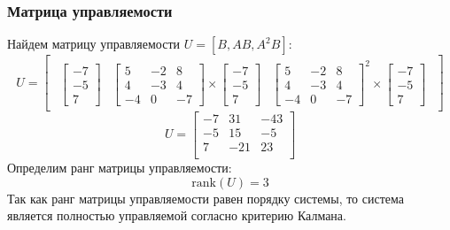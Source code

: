 \subsubsection{Матрица управляемости}
Найдем матрицу управляемости $U = [B, AB, A^2B]$: 
\begin{equation}
    U = \begin{bmatrix} 
        \begin{array}{c|c|c}
            \begin{bmatrix}
                -7 \\
                -5 \\
                7
            \end{bmatrix} & 
            \begin{bmatrix}
                5 & -2 & 8 \\
                4 & -3 & 4 \\
                -4 & 0 & -7
            \end{bmatrix} \times 
            \begin{bmatrix}
                -7 \\
                -5 \\
                7
            \end{bmatrix} &
            \begin{bmatrix}
                5 & -2 & 8 \\
                4 & -3 & 4 \\
                -4 & 0 & -7
            \end{bmatrix}^2 \times
            \begin{bmatrix}
                -7 \\
                -5 \\
                7
            \end{bmatrix}
        \end{array}   
    \end{bmatrix}
\end{equation}
\begin{equation}
    U = \begin{bmatrix}
        -7 & 31 & -43 \\
        -5 & 15 & -5 \\
        7 & -21 & 23 \\
    \end{bmatrix}
\end{equation}
Определим ранг матрицы управляемости:
\begin{equation}
    \text{rank}(U) = 3
\end{equation}
Так как ранг матрицы управляемости равен порядку системы, то система является полностью управляемой согласно критерию Калмана.


